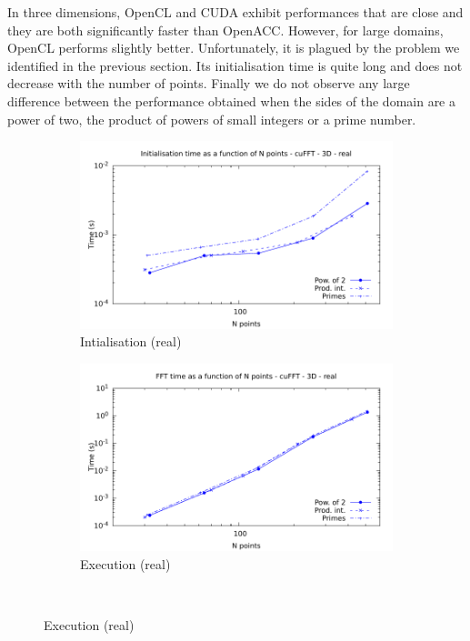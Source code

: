 \documentclass[12pt, a4paper]{article}
\begin{document}
In three dimensions, OpenCL and CUDA exhibit performances that are close and they are both significantly faster than OpenACC. However, for large domains, OpenCL performs slightly better. Unfortunately, it is plagued by the problem we identified in the previous section. Its initialisation time is quite long and does not decrease with the number of points. Finally we do not observe any large difference between the performance obtained when the sides of the domain are a power of two, the product of powers of small integers or a prime number.

\begin{figure}[H]
\captionsetup{width=0.8\linewidth}
\centering
\begin{subfigure}{.5\textwidth}
\centering
\includegraphics[width=.9\linewidth]{graphs/fft-cuda-3d-pow2-r-init.pdf}
\caption{Intialisation (real)}
\label{FFTCUDA3DRI}
\end{subfigure}%
\begin{subfigure}{.5\textwidth}
\centering
\includegraphics[width=.9\linewidth]{graphs/fft-cuda-3d-pow2-r-exec.pdf}
\caption{Execution (real)}
\label{FFTCUDA3DRE}
\end{subfigure}\\

\end{figure}
\end{document}
